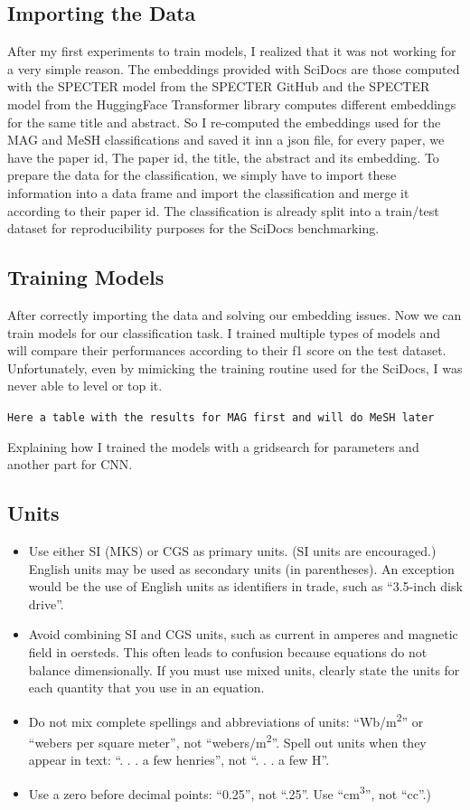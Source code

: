 \documentclass[conference]{IEEEtran}
\begin{document}
\subsection{Importing the Data}

After my first experiments to train models, I realized that it was not working for a very simple reason. The embeddings provided with SciDocs are those computed with the SPECTER model from the SPECTER GitHub and the SPECTER model from the HuggingFace Transformer library computes different embeddings for the same title and abstract. So I re-computed the embeddings used for the MAG and MeSH classifications and saved it inn a json file, for every paper, we have the paper id, The paper id, the title, the abstract and its embedding. To prepare the data for the classification, we simply have to import these information into a data frame and import the classification and merge it according to their paper id. The classification is already split into a train/test dataset for reproducibility purposes for the SciDocs benchmarking.

\subsection{Training Models}

After correctly importing the data and solving our embedding issues. Now we can train models for our classification task. I trained multiple types of models and will compare their performances according to their f1 score on the test dataset. Unfortunately, even by mimicking the training routine used for the SciDocs, I was never able to level or top it.

\texttt{Here a table with the results for MAG first and will do MeSH later}

Explaining how I trained the models with a gridsearch for parameters and another part for CNN. 


\subsection{Units}
\begin{itemize}
\item Use either SI (MKS) or CGS as primary units. (SI units are encouraged.) English units may be used as secondary units (in parentheses). An exception would be the use of English units as identifiers in trade, such as ``3.5-inch disk drive''.
\item Avoid combining SI and CGS units, such as current in amperes and magnetic field in oersteds. This often leads to confusion because equations do not balance dimensionally. If you must use mixed units, clearly state the units for each quantity that you use in an equation.
\item Do not mix complete spellings and abbreviations of units: ``Wb/m\textsuperscript{2}'' or ``webers per square meter'', not ``webers/m\textsuperscript{2}''. Spell out units when they appear in text: ``. . . a few henries'', not ``. . . a few H''.
\item Use a zero before decimal points: ``0.25'', not ``.25''. Use ``cm\textsuperscript{3}'', not ``cc''.)
\end{itemize}
\end{document}

